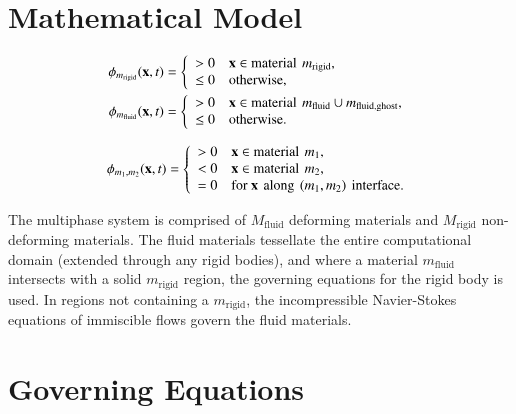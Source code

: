 \documentclass[preprint,12pt]{Definitions/elsarticle}
\newcommand{\mb}{\mathbf}
\newcommand{\tn}{\textnormal}
\begin{document}
\FloatBarrier
\section{Mathematical Model}
	\begin{align}
		\phi_{m_\textrm{rigid}}(\mb{x},t) &= \left\{
		\begin{array}{ll}
			> 0 & \mb{x} \in \tn{material}\,\: m_\textrm{rigid}, \\ 
			\leq 0 & \tn{otherwise},
		\end{array}
		\right.\\
		\phi_{m_\textrm{fluid}}(\mb{x},t) &= \left\{
		\begin{array}{ll}
			> 0 & \mb{x} \in \tn{material}\,\: m_\textrm{fluid}\cup m_\textrm{fluid,ghost}, \\ 
			\leq 0 & \tn{otherwise}.
		\end{array}
		\right.
	\end{align}

	\begin{equation}
	\phi_{m_1,m_2}(\mb{x},t) = \left\{
	\begin{array}{ll}
	> 0 & \mb{x} \in \tn{material}\,\: m_1, \\ 
	< 0 & \mb{x} \in \tn{material}\,\: m_2, \\ 
	= 0 & \tn{for }\mb{x}\,\: \tn{along}\,\:(m_1,m_2)\,\:\tn{interface}. \\ 
	\end{array}
	\right.
	\end{equation}
	
The multiphase system is comprised of $M_{\textrm{fluid}}$ deforming materials and $M_{\textrm{rigid}}$ non-deforming materials. The fluid materials tessellate the entire computational domain (extended through any rigid bodies), and where a material $m_{\textrm{fluid}}$ intersects with a solid $m_{\textrm{rigid}}$ region, the governing equations for the rigid body is used. In regions not containing a $m_{\textrm{rigid}}$, the incompressible Navier-Stokes equations of immiscible flows govern the fluid materials.

\section{Governing Equations} \label{governingeqs}
\end{document}
